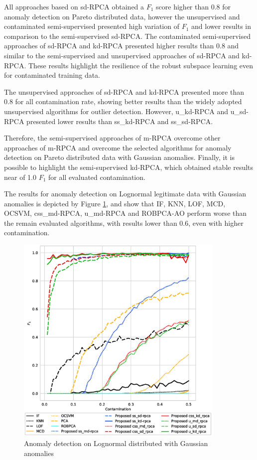 \documentclass[review]{elsarticle}
\begin{document}
All approaches based on sd-RPCA obtained a $F_1$ score higher than 0.8 for anomaly detection on Pareto distributed data, however the unsupervised and contaminated semi-supervised presented high variation of $F_1$ and lower results in comparison to the semi-supervised sd-RPCA. The contaminated semi-supervised approaches of sd-RPCA and kd-RPCA presented higher results than 0.8 and similar to the semi-supervised and unsupervised approaches of sd-RPCA and kd-RPCA. These results highlight the resilience of the robust subspace learning even for contaminated training data.

The unsupervised approaches of sd-RPCA and kd-RPCA presented more than 0.8 for all contamination rate, showing better results than the widely adopted unsupervised algorithms for outlier detection. However, u\_kd-RPCA and u\_sd-RPCA presented lower results than ss\_kd-RPCA and ss\_sd-RPCA. 

Therefore, the semi-supervised approaches of m-RPCA overcome other approaches of m-RPCA and overcome the selected algorithms for anomaly detection on Pareto distributed data with Gaussian anomalies. Finally, it is possible to highlight the semi-supervised kd-RPCA, which obtained stable results near of 1.0 $F_1$ for all evaluated contamination.

The results for anomaly detection on Lognormal legitimate data with Gaussian anomalies is depicted by Figure \ref{fig:4.12}, and show that IF, KNN, LOF, MCD, OCSVM, css\_md-RPCA, u\_md-RPCA and ROBPCA-AO perform worse than the remain evaluated algorithms, with results lower than 0.6, even with higher contamination.

\begin{figure}[h!]
	\centering
	\includegraphics[width=10cm]{figures/lognormal_f1_contamination.eps}
	\caption{Anomaly detection on Lognormal distributed with Gaussian anomalies}
	\label{fig:4.12}
\end{figure}
\end{document}
